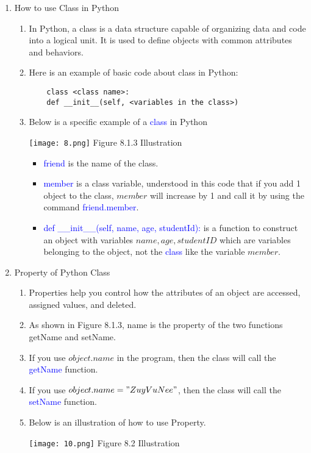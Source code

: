 \documentclass[12pt]{scrartcl}
\begin{document}
\begin{enumerate}
\item How to use Class in Python

    \begin{enumerate}
    \item In Python, a class is a data structure capable of organizing data and code into a logical unit. It is used to define objects with common attributes and behaviors.
    \item Here is an example of basic code about class in Python:
    \begin{lstlisting}
    class <class name>:
    def __init__(self, <variables in the class>)
    \end{lstlisting}
    \item Below is a specific example of a \textcolor{blue}{class} in Python
        \begin{center}
            \texttt{[image: 8.png]}
            Figure 8.1.3 Illustration
        \end{center}
    \begin{itemize}
        \item \textcolor{blue}{friend} is the name of the class.
        \item \textcolor{blue}{member} is a class variable, understood in this code that if you add 1 object to the class, $member$ will increase by 1 and call it by using the command \textcolor{blue}{friend.member}.
        \item \textcolor{blue}{def \_\_init\_\_(self, name, age, studentId):} is a function to construct an object with variables $name, age, studentID$ which are variables belonging to the object, not the \textcolor{blue}{class} like the variable $member$.
    \end{itemize}

    \end{enumerate}

\item Property of Python Class

    \begin{enumerate}
    \item Properties help you control how the attributes of an object are accessed, assigned values, and deleted.
    \item As shown in Figure 8.1.3, name is the property of the two functions getName and setName.
    \item If you use $object.name$ in the program, then the class will call the \textcolor{blue}{getName} function.
    \item If you use $object.name = "ZuyVuNee"$, then the class will call the \textcolor{blue}{setName} function.
    \item Below is an illustration of how to use Property.
        \begin{center}
            \texttt{[image: 10.png]}
            Figure 8.2 Illustration
        \end{center}
    \end{enumerate}
\end{enumerate}
\end{document}
